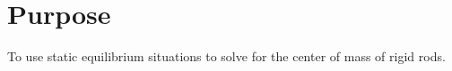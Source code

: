 
\section{Purpose}
\vspace{-0.5cm}
\singlespacing
To use static equilibrium situations to solve for the center of mass of rigid rods. 
